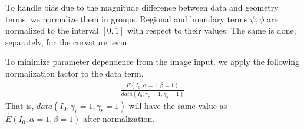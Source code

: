 \documentclass[review]{siamart220329}
\begin{document}
%
%
To handle bias due to the magnitude difference between data and geometry terms,
we normalize them in groups. Regional and boundary terms $\psi,\phi$ are
normalized to the interval $[0,1]$ with respect to their values. The same is
done, separately, for the curvature term.

To minimize parameter dependence from the image input, we apply the following 
normalization factor to the data term.
%
%
\begin{align*}
    \frac{\hat{E}(I_0,\alpha=1,\beta=1)}{data(I_0,\gamma_r=1, \gamma_b=1)}.
\end{align*}
%
%
That is, $data(I_0,\gamma_r=1, \gamma_b=1)$ will have the same value as 
$\hat{E}(I_0, \alpha=1, \beta=1)$ after normalization.

%
%
\end{document}
